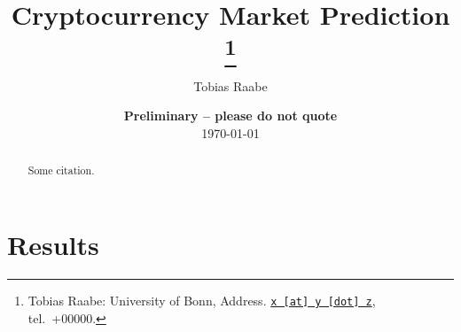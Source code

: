 \usepackage{a4wide}
\usepackage[T1]{fontenc}
\usepackage[utf8]{inputenc}
\usepackage{float, afterpage, rotating, graphicx}
\usepackage{epstopdf}
\usepackage{longtable, booktabs, tabularx}
\usepackage{fancyvrb, moreverb, relsize}
\usepackage{eurosym, calc, chngcntr}
\usepackage{amsmath, amssymb, amsfonts, amsthm, bm}
\usepackage{caption}
\usepackage{mdwlist}
\usepackage{xfrac}
\usepackage{setspace}
\usepackage{xcolor}

\usepackage[
    natbib=true,
    bibencoding=inputenc,
    bibstyle=authoryear-ibid,
    citestyle=authoryear-comp,
    maxcitenames=3,
    maxbibnames=10,
    useprefix=false,
    sortcites=true,
    backend=biber
]{biblatex}
\setlength{\bibitemsep}{1.5ex}
% 

\usepackage[unicode=true]{hyperref}
\hypersetup{
    colorlinks=true,
    linkcolor=black,
    anchorcolor=black,
    citecolor=black,
    filecolor=black,
    menucolor=black,
    runcolor=black,
    urlcolor=black
}



\setlength{\parskip}{1ex}
\setlength{\parindent}{0ex}




\title{Cryptocurrency Market Prediction
\thanks{Tobias Raabe: University of Bonn, Address. \href{mailto:x@y.z} {\nolinkurl{x [at] y [dot] z}}, tel.~+00000.}
}

\author{Tobias Raabe
}

\date{
{\bf Preliminary -- please do not quote}
\\[1ex]
\today
}

\maketitle


\begin{abstract}
	Some citation.
\end{abstract}
\clearpage

\section{Results} %
\label{sec:results}

